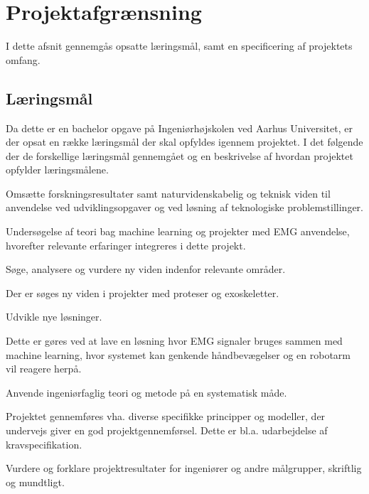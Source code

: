 \thispagestyle{fancy}
\chapter{Projektafgrænsning}
\label{chp:projektafgraensning}
I dette afsnit gennemgås opsatte læringsmål, samt en specificering af projektets omfang. 
\section{Læringsmål}
Da dette er en bachelor opgave på Ingeniørhøjskolen ved Aarhus Universitet, er der opsat en række læringsmål der skal opfyldes igennem projektet. I det følgende der de forskellige læringsmål gennemgået og en beskrivelse af hvordan projektet opfylder læringsmålene.
\begin{myItemize}
	\item Omsætte forskningsresultater samt naturvidenskabelig og teknisk viden til anvendelse ved udviklingsopgaver og ved løsning af teknologiske problemstillinger.
	\begin{myItemize}
		\item Undersøgelse af teori bag machine learning og projekter med EMG anvendelse, hvorefter relevante erfaringer integreres i dette projekt. 
	\end{myItemize}
	\item Søge, analysere og vurdere ny viden indenfor relevante områder.
	\begin{myItemize}
		\item Der er søges ny viden i projekter med proteser og exoskeletter. 
	\end{myItemize}
	\item Udvikle nye løsninger.
	\begin{myItemize}
		\item Dette er gøres ved at lave en løsning hvor EMG signaler bruges sammen med machine learning, hvor systemet kan genkende håndbevægelser og en robotarm vil reagere herpå.
	\end{myItemize}
	\item Anvende ingeniørfaglig teori og metode på en systematisk måde.
	\begin{myItemize}
		\item Projektet gennemføres vha. diverse specifikke principper og modeller, der undervejs giver en god projektgennemførsel. Dette er bl.a. udarbejdelse af kravspecifikation.
	\end{myItemize}
	\item Vurdere og forklare projektresultater for ingeniører og andre målgrupper, skriftlig og mundtligt.

\end{myItemize}
